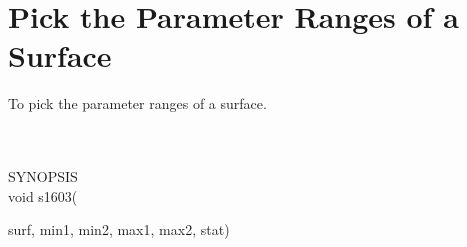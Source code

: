 \section{Pick the Parameter Ranges of a Surface}
\begin{minipg1}
  To pick the parameter ranges of a surface.
\end{minipg1} \\ \\
SYNOPSIS\\
        \>void s1603(\begin{minipg3}
                                {\fov surf}, {\fov min1}, {\fov min2}, {\fov max1}, {\fov max2}, {\fov stat})
                \end{minipg3}\\[0.3ex]

